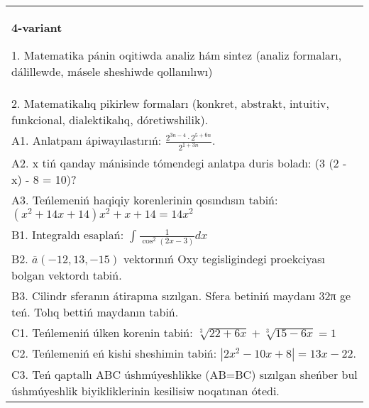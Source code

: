 \documentclass{article}
\begin{document}
\begin{tabular}{m{17cm}}
\textbf{4-variant}

1. Matematika pánin oqitiwda analiz hám sintez (analiz formaları, dálillewde, másele sheshiwde qollanılıwı) \\
2. Matematikalıq pikirlew formaları (konkret, abstrakt, intuitiv, funkcional, dialektikalıq, dóretiwshilik). \\
A1. Anlatpanı ápiwayılastırıń: \(\frac{2^{3n - 4} \cdot 2^{5 + 6n}}{2^{1 + 3n}}\). \\
A2. x tiń qanday mánisinde tómendegi anlatpa duris boladı: (3 (2 - x) - 8 = 10)? \\
A3. Teńlemeniń haqiqiy korenlerinin qosındısın tabiń: \((x^2 + 14x + 14) x^2 + x + 14 = 14x^2\) \\
B1. Integraldı esaplań: \(\int_{}^{}{\frac{1}{\cos^{2} (2x - 3) }dx}\) \\
B2. \(\overline{a} (- 12,13, - 15) \) vektorınıń Oxy tegisligindegi proekciyası bolgan vektordı tabiń. \\
B3. Cilindr sferanın átirapına sızılgan. Sfera betiniń maydanı 32π ge teń. Tolıq bettiń maydanın tabiń. \\
C1. Teńlemeniń úlken korenin tabiń: \(\sqrt[3]{22 + 6x} + \sqrt[3]{15 - 6x} = 1\) \\
C2. Teńlemeniń eń kishi sheshimin tabiń: \(\left| 2x^2 - 10x + 8 \right| = 13x - 22\). \\
C3. Teń qaptallı ABC úshmúyeshlikke (AB=BC) sızılgan sheńber bul úshmúyeshlik biyikliklerinin kesilisiw noqatınan ótedi. \\

\end{tabular}
\vspace{1cm}
\end{document}
